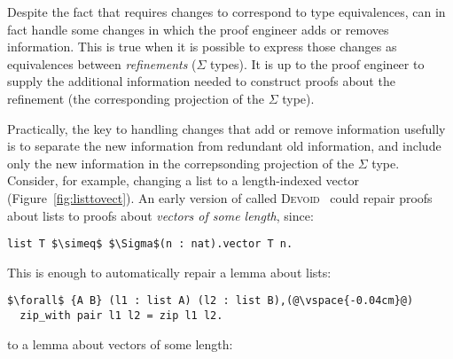 Despite the fact that \toolname requires changes to correspond to type equivalences,
\toolname can in fact handle some changes in which the proof engineer adds or removes information.
This is true when it is possible to express those changes as equivalences between \textit{refinements} ($\Sigma$ types).
It is up to the proof engineer to supply the additional information needed to construct proofs about the refinement
(the corresponding projection of the $\Sigma$ type).



\begin{figure*}
\begin{minipage}{0.40\textwidth}
   
\end{minipage}
\hfill
\begin{minipage}{0.58\textwidth}
   
\end{minipage}
\vspace{-0.3cm}
\caption{A vector (right) is a list (left) indexed by its length.}
\label{fig:listtovect}
\end{figure*}

Practically, the key to handling changes that add or remove information usefully is to separate the new information from redundant old information, 
and include only the new information in the correpsonding projection of the $\Sigma$ type.
Consider, for example, changing a list to a length-indexed vector (Figure~\ref{fig:listtovect}).
An early version of \toolname called \textsc{Devoid}~\cite{Ringer2019} could repair proofs about lists to proofs about \textit{vectors of some length}, since:

\begin{lstlisting}
list T $\simeq$ $\Sigma$(n : nat).vector T n.
\end{lstlisting}
This is enough to automatically repair a lemma about lists:

\begin{lstlisting}
$\forall$ {A B} (l1 : list A) (l2 : list B),(@\vspace{-0.04cm}@)
  zip_with pair l1 l2 = zip l1 l2.
\end{lstlisting}
to a lemma about vectors of some length:

